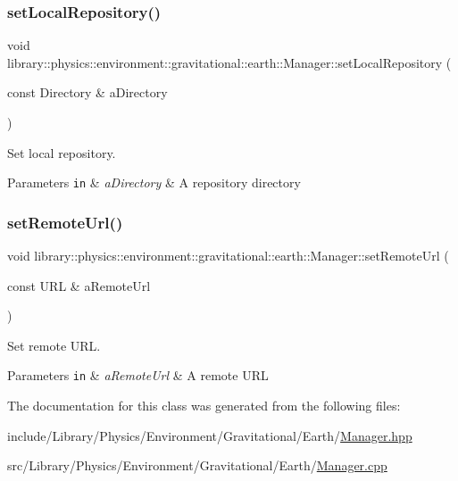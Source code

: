 \subsubsection{\texorpdfstring{set\+Local\+Repository()}{setLocalRepository()}}
{\footnotesize\ttfamily void library\+::physics\+::environment\+::gravitational\+::earth\+::\+Manager\+::set\+Local\+Repository (\begin{DoxyParamCaption}\item[{const Directory \&}]{a\+Directory }\end{DoxyParamCaption})}



Set local repository. 


\begin{DoxyParams}[1]{Parameters}
\mbox{\tt in}  & {\em a\+Directory} & A repository directory \\
\hline
\end{DoxyParams}
\mbox{\label{classlibrary_1_1physics_1_1environment_1_1gravitational_1_1earth_1_1_manager_aa947a0fc00aa98c881a10f904b441cb9}} 
\subsubsection{\texorpdfstring{set\+Remote\+Url()}{setRemoteUrl()}}
{\footnotesize\ttfamily void library\+::physics\+::environment\+::gravitational\+::earth\+::\+Manager\+::set\+Remote\+Url (\begin{DoxyParamCaption}\item[{const U\+RL \&}]{a\+Remote\+Url }\end{DoxyParamCaption})}



Set remote U\+RL. 


\begin{DoxyParams}[1]{Parameters}
\mbox{\tt in}  & {\em a\+Remote\+Url} & A remote U\+RL \\
\hline
\end{DoxyParams}


The documentation for this class was generated from the following files\+:\begin{DoxyCompactItemize}
\item 
include/\+Library/\+Physics/\+Environment/\+Gravitational/\+Earth/\hyperlink{_environment_2_gravitational_2_earth_2_manager_8hpp}{Manager.\+hpp}\item 
src/\+Library/\+Physics/\+Environment/\+Gravitational/\+Earth/\hyperlink{_environment_2_gravitational_2_earth_2_manager_8cpp}{Manager.\+cpp}\end{DoxyCompactItemize}
